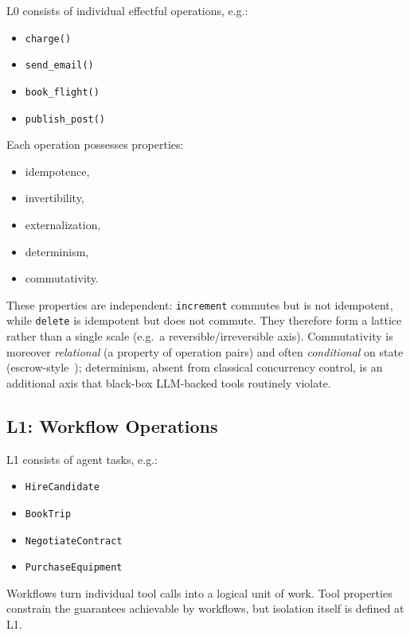 \documentclass[11pt]{article}
\begin{document}
L0 consists of individual effectful operations, e.g.:

\begin{itemize}
    \item \texttt{charge()}
    \item \texttt{send\_email()}
    \item \texttt{book\_flight()}
    \item \texttt{publish\_post()}
\end{itemize}

Each operation possesses properties:

\begin{itemize}
\item idempotence,
\item invertibility,
\item externalization,
\item determinism,
\item commutativity.
\end{itemize}

These properties are independent: \texttt{increment} commutes but is not
idempotent, while \texttt{delete} is idempotent but does not commute. They
therefore form a lattice rather than a single scale (e.g.\ a
reversible/irreversible axis). Commutativity is moreover \emph{relational}
(a property of operation pairs) and often \emph{conditional} on state
(escrow-style~\cite{oneil1986escrow}); determinism, absent from classical
concurrency control, is an additional axis that black-box LLM-backed tools
routinely violate.

\subsection{L1: Workflow Operations}

L1 consists of agent tasks, e.g.:

\begin{itemize}
    \item \texttt{HireCandidate}
    \item \texttt{BookTrip}
    \item \texttt{NegotiateContract}
    \item \texttt{PurchaseEquipment}
\end{itemize}

Workflows turn individual tool calls into a logical unit of work. Tool properties constrain the guarantees achievable by workflows, but
isolation itself is defined at L1.
\end{document}
